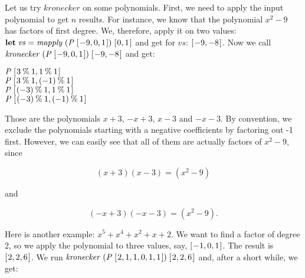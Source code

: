 \documentclass[tikz]{scrreprt}
\newcommand{\Conid}[1]{\mathit{#1}}
\newcommand{\Varid}[1]{\mathit{#1}}
\begin{document}
Let us try \ensuremath{\Varid{kronecker}} on some polynomials.
First, we need to apply the input polynomial
to get $n$ results. For instance, we know
that the polynomial $x^2 - 9$ has factors
of first degree. We, therefore, apply it on
two values: \ensuremath{\mathbf{let}\;\Varid{vs}\mathrel{=}\Varid{mapply}\;(\Conid{P}\;[\mskip1.5mu \mathbin{-}\mathrm{9},\mathrm{0},\mathrm{1}\mskip1.5mu])\;[\mskip1.5mu \mathrm{0},\mathrm{1}\mskip1.5mu]}
and get for \ensuremath{\Varid{vs}}: \ensuremath{[\mskip1.5mu \mathbin{-}\mathrm{9},\mathbin{-}\mathrm{8}\mskip1.5mu]}.
Now we call \ensuremath{\Varid{kronecker}\;(\Conid{P}\;[\mskip1.5mu \mathbin{-}\mathrm{9},\mathrm{0},\mathrm{1}\mskip1.5mu])\;[\mskip1.5mu \mathbin{-}\mathrm{9},\mathbin{-}\mathrm{8}\mskip1.5mu]}
and get:

\ensuremath{\Conid{P}\;[\mskip1.5mu \mathrm{3}\mathbin{\%}\mathrm{1},\mathrm{1}\mathbin{\%}\mathrm{1}\mskip1.5mu]}\\
\ensuremath{\Conid{P}\;[\mskip1.5mu \mathrm{3}\mathbin{\%}\mathrm{1},(\mathbin{-}\mathrm{1})\mathbin{\%}\mathrm{1}\mskip1.5mu]}\\
\ensuremath{\Conid{P}\;[\mskip1.5mu (\mathbin{-}\mathrm{3})\mathbin{\%}\mathrm{1},\mathrm{1}\mathbin{\%}\mathrm{1}\mskip1.5mu]}\\
\ensuremath{\Conid{P}\;[\mskip1.5mu (\mathbin{-}\mathrm{3})\mathbin{\%}\mathrm{1},(\mathbin{-}\mathrm{1})\mathbin{\%}\mathrm{1}\mskip1.5mu]}

Those are the polynomials $x+3$, $-x+3$, $x-3$ and $-x-3$.
By convention, we exclude the polynomials starting with
a negative coefficients by factoring out -1 first.
However, we can easily see that all of them are actually
factors of $x^2 - 9$, since

\begin{equation}
(x+3)(x-3) = (x^2-9)
\end{equation}

and

\begin{equation}
(-x+3)(-x-3) = (x^2-9).
\end{equation}

Here is another example: $x^5 + x^4 + x^2 + x + 2$.
We want to find a factor of degree 2,
so we apply the polynomial to three values, say,
\ensuremath{[\mskip1.5mu \mathbin{-}\mathrm{1},\mathrm{0},\mathrm{1}\mskip1.5mu]}. The result is \ensuremath{[\mskip1.5mu \mathrm{2},\mathrm{2},\mathrm{6}\mskip1.5mu]}.
We run \ensuremath{\Varid{kronecker}\;(\Conid{P}\;[\mskip1.5mu \mathrm{2},\mathrm{1},\mathrm{1},\mathrm{0},\mathrm{1},\mathrm{1}\mskip1.5mu])\;[\mskip1.5mu \mathrm{2},\mathrm{2},\mathrm{6}\mskip1.5mu]} 
and, after a short while, we get:
\end{document}
